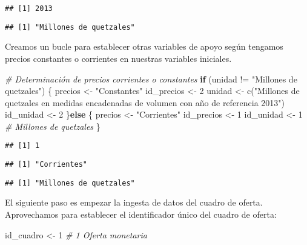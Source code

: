 \documentclass[
]{article}
\newenvironment{Shaded}{\begin{snugshade}}{\end{snugshade}}
\newcommand{\CommentTok}[1]{\textcolor[rgb]{0.56,0.35,0.01}{\textit{#1}}}
\newcommand{\ControlFlowTok}[1]{\textcolor[rgb]{0.13,0.29,0.53}{\textbf{#1}}}
\newcommand{\DecValTok}[1]{\textcolor[rgb]{0.00,0.00,0.81}{#1}}
\newcommand{\FunctionTok}[1]{\textcolor[rgb]{0.00,0.00,0.00}{#1}}
\newcommand{\NormalTok}[1]{#1}
\newcommand{\OtherTok}[1]{\textcolor[rgb]{0.56,0.35,0.01}{#1}}
\newcommand{\SpecialCharTok}[1]{\textcolor[rgb]{0.00,0.00,0.00}{#1}}
\newcommand{\StringTok}[1]{\textcolor[rgb]{0.31,0.60,0.02}{#1}}
\begin{document}
\begin{verbatim}
## [1] 2013
\end{verbatim}

\begin{verbatim}
## [1] "Millones de quetzales"
\end{verbatim}

Creamos un bucle para establecer otras variables de apoyo según tengamos
precios constantes o corrientes en nuestras variables iniciales.

\begin{Shaded}
\begin{Highlighting}[]
\CommentTok{\# Determinación de precios corrientes o constantes}
\ControlFlowTok{if}\NormalTok{ (unidad }\SpecialCharTok{!=} \StringTok{"Millones de quetzales"}\NormalTok{) \{}
\NormalTok{  precios }\OtherTok{\textless{}{-}} \StringTok{"Constantes"}
\NormalTok{  id\_precios }\OtherTok{\textless{}{-}} \DecValTok{2}
\NormalTok{  unidad }\OtherTok{\textless{}{-}} \FunctionTok{c}\NormalTok{(}\StringTok{"Millones de quetzales en medidas encadenadas de volumen con año de referencia 2013"}\NormalTok{)}
\NormalTok{  id\_unidad }\OtherTok{\textless{}{-}} \DecValTok{2}
\NormalTok{\}}\ControlFlowTok{else}\NormalTok{ \{}
\NormalTok{  precios }\OtherTok{\textless{}{-}} \StringTok{"Corrientes"}
\NormalTok{  id\_precios }\OtherTok{\textless{}{-}} \DecValTok{1}
\NormalTok{  id\_unidad }\OtherTok{\textless{}{-}} \DecValTok{1} \CommentTok{\# Millones de quetzales}
\NormalTok{\}}
\end{Highlighting}
\end{Shaded}

\begin{verbatim}
## [1] 1
\end{verbatim}

\begin{verbatim}
## [1] "Corrientes"
\end{verbatim}

\begin{verbatim}
## [1] "Millones de quetzales"
\end{verbatim}

El siguiente paso es empezar la ingesta de datos del cuadro de oferta.
Aprovechamos para establecer el identificador único del cuadro de
oferta:

\begin{Shaded}
\begin{Highlighting}[]
\NormalTok{id\_cuadro }\OtherTok{\textless{}{-}} \DecValTok{1} \CommentTok{\# 1  Oferta monetaria}
\end{Highlighting}
\end{Shaded}
\end{document}
